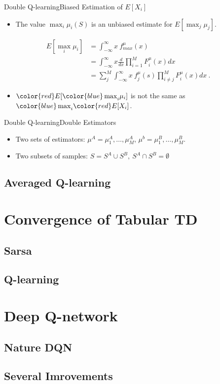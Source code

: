\documentclass{beamer}
\newcommand{\red}[1]{{\color{red} #1}}
\newcommand{\blue}[1]{{\color{blue} #1}}
\begin{document}
\begin{frame}{Double Q-learning}{Biased Estimation of $E[X_i]$}
	\begin{itemize}
		\item The value $\max_i \mu_i(S)$ is an unbiased estimate for $E[\max_j \mu_j]$.
	\end{itemize}
	\begin{equation}
	\begin{aligned}
		E[\max_i \mu_i] &= \int_{-\infty}^{\infty} x ~f_{max}^{\mu}(x) \\
		&= \int_{-\infty}^{\infty}x\frac{d}{dx}\prod_{i=1}^M F_i^{\mu}(x)dx \\
		&= \sum_j^M \int_{-\infty}^{\infty}x ~f_j^{\mu}(s) \prod_{i\neq j}^M F_i^{\mu}(x)dx ~.
	\end{aligned}
	\end{equation}
	\begin{itemize}
		\item $\red{E}[\blue{\max}_i \mu_i]$ is not the same as $\blue{\max}_i \red{E}[X_i]$.
	\end{itemize}
\end{frame}

\begin{frame}{Double Q-learning}{Double Estimators}
	\begin{itemize}
		\item Two sets of estimators: $\mu^A={\mu_1^A,\ldots,\mu_M^A}$, $\mu^b={\mu_1^B,\ldots,\mu_M^B}$.
		\item Two subsets of samples: $S=S^A\cup S^B,~S^A \cap S^B = \emptyset$
	\end{itemize}
\end{frame}


\subsection{Averaged Q-learning}



\section{Convergence of Tabular TD}
\subsection{Sarsa}
\subsection{Q-learning}




\section{Deep Q-network}

\subsection{Nature DQN}
\subsection{Several Imrovements}
\end{document}
